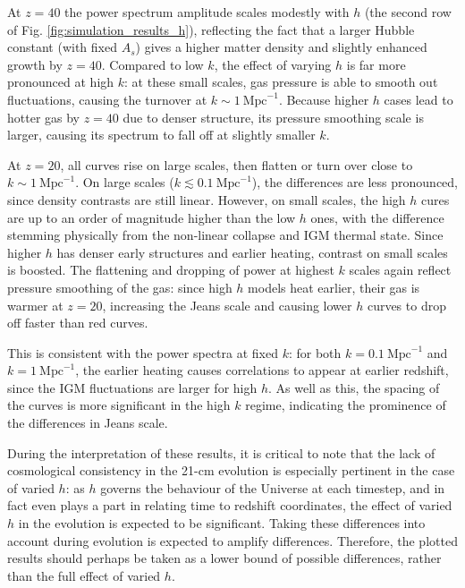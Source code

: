 \documentclass[floats,floatfix,showpacs,amssymb,prd,superscriptaddress,nofootinbib]{revtex4-2} %
\begin{document}
At $z = 40$ the power spectrum amplitude scales modestly with $h$ (the second row of Fig. \ref{fig:simulation_results_h}), reflecting the fact that a larger Hubble constant (with fixed $A_s$) gives a higher matter density and slightly enhanced growth by $z = 40$. Compared to low $k$, the effect of varying $h$ is far more pronounced at high $k$: at these small scales, gas pressure is able to smooth out fluctuations, causing the turnover at $k \sim 1 ~\text{Mpc}^{-1}$. Because higher $h$ cases lead to hotter gas by $z = 40$ due to denser structure, its pressure smoothing scale is larger, causing its spectrum to fall off at slightly smaller $k$. 

At $z = 20$, all curves rise on large scales, then flatten or turn over close to $k \sim 1 ~\text{Mpc}^{-1}$. On large scales ($k \lesssim 0.1 ~\text{Mpc}^{-1}$), the differences are less pronounced, since density contrasts are still linear. However, on small scales, the high $h$ cures are up to an order of magnitude higher than the low $h$ ones, with the difference stemming physically from the non-linear collapse and IGM thermal state. Since higher $h$ has denser early structures and earlier heating, contrast on small scales is boosted. The flattening and dropping of power at highest $k$ scales again reflect pressure smoothing of the gas: since high $h$ models heat earlier, their gas is warmer at $z = 20$, increasing the Jeans scale and causing lower $h$ curves to drop off faster than red curves.

This is consistent with the power spectra at fixed $k$: for both $k = 0.1 ~\text{Mpc}^{-1}$ and $k = 1 ~\text{Mpc}^{-1}$, the earlier heating causes correlations to appear at earlier redshift, since the IGM fluctuations are larger for high $h$. As well as this, the spacing of the curves is more significant in the high $k$ regime, indicating the prominence of the differences in Jeans scale.

During the interpretation of these results, it is critical to note that the lack of cosmological consistency in the 21-cm evolution is especially pertinent in the case of varied $h$: as $h$ governs the behaviour of the Universe at each timestep, and in fact even plays a part in relating time to redshift coordinates, the effect of varied $h$ in the evolution is expected to be significant. Taking these differences into account during evolution is expected to amplify differences. Therefore, the plotted results should perhaps be taken as a lower bound of possible differences, rather than the full effect of varied $h$.
\end{document}
